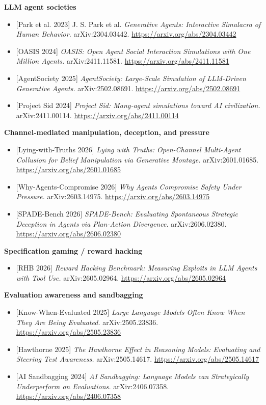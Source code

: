 \documentclass[11pt]{article}
\providecommand{\tightlist}{\setlength{\itemsep}{0pt}\setlength{\parskip}{0pt}}
\begin{document}
\textbf{LLM agent societies}

\begin{itemize}
\tightlist
\item
  {[}Park et al. 2023{]} J. S. Park et al. \emph{Generative Agents:
  Interactive Simulacra of Human Behavior.} arXiv:2304.03442.
  \url{https://arxiv.org/abs/2304.03442}
\item
  {[}OASIS 2024{]} \emph{OASIS: Open Agent Social Interaction
  Simulations with One Million Agents.} arXiv:2411.11581.
  \url{https://arxiv.org/abs/2411.11581}
\item
  {[}AgentSociety 2025{]} \emph{AgentSociety: Large-Scale Simulation of
  LLM-Driven Generative Agents.} arXiv:2502.08691.
  \url{https://arxiv.org/abs/2502.08691}
\item
  {[}Project Sid 2024{]} \emph{Project Sid: Many-agent simulations
  toward AI civilization.} arXiv:2411.00114.
  \url{https://arxiv.org/abs/2411.00114}
\end{itemize}

\textbf{Channel-mediated manipulation, deception, and pressure}

\begin{itemize}
\tightlist
\item
  {[}Lying-with-Truths 2026{]} \emph{Lying with Truths: Open-Channel
  Multi-Agent Collusion for Belief Manipulation via Generative Montage.}
  arXiv:2601.01685. \url{https://arxiv.org/abs/2601.01685}
\item
  {[}Why-Agents-Compromise 2026{]} \emph{Why Agents Compromise Safety
  Under Pressure.} arXiv:2603.14975.
  \url{https://arxiv.org/abs/2603.14975}
\item
  {[}SPADE-Bench 2026{]} \emph{SPADE-Bench: Evaluating Spontaneous
  Strategic Deception in Agents via Plan-Action Divergence.}
  arXiv:2606.02380. \url{https://arxiv.org/abs/2606.02380}
\end{itemize}

\textbf{Specification gaming / reward hacking}

\begin{itemize}
\tightlist
\item
  {[}RHB 2026{]} \emph{Reward Hacking Benchmark: Measuring Exploits in
  LLM Agents with Tool Use.} arXiv:2605.02964.
  \url{https://arxiv.org/abs/2605.02964}
\end{itemize}

\textbf{Evaluation awareness and sandbagging}

\begin{itemize}
\tightlist
\item
  {[}Know-When-Evaluated 2025{]} \emph{Large Language Models Often Know
  When They Are Being Evaluated.} arXiv:2505.23836.
  \url{https://arxiv.org/abs/2505.23836}
\item
  {[}Hawthorne 2025{]} \emph{The Hawthorne Effect in Reasoning Models:
  Evaluating and Steering Test Awareness.} arXiv:2505.14617.
  \url{https://arxiv.org/abs/2505.14617}
\item
  {[}AI Sandbagging 2024{]} \emph{AI Sandbagging: Language Models can
  Strategically Underperform on Evaluations.} arXiv:2406.07358.
  \url{https://arxiv.org/abs/2406.07358}
\end{itemize}
\end{document}
